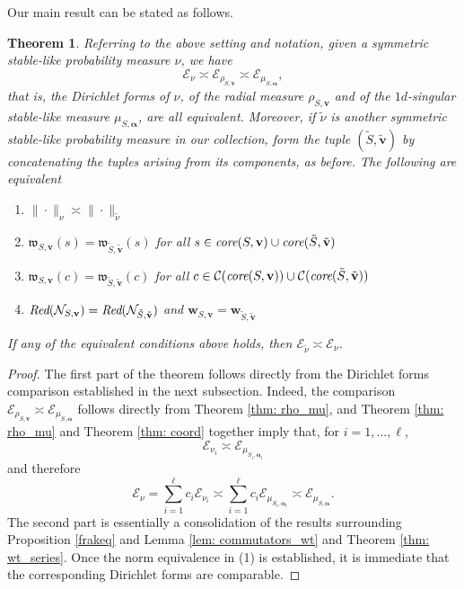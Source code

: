 \documentclass[pdflatex,sn-mathphys-num]{sn-jnl}%
\theoremstyle{thmstyleone}%
\newtheorem{theo}{Theorem}%
\theoremstyle{thmstyletwo}%
\theoremstyle{thmstylethree}%
\begin{document}
 Our main result can be stated as follows.
\begin{theo}
\label{thm: main1}
Referring to the above setting and notation, given a symmetric stable-like probability measure $\nu$, we have
$$\mathcal E_\nu\asymp \mathcal E_{\rho_{S,\mathbf{v}}}\asymp \mathcal E_{\mu_{S,\bm{\alpha}}},$$
that is, the Dirichlet forms of $\nu$, of the radial measure $\rho_{S,\mathbf{v}}$ and of the $1d$-singular stable-like measure $\mu_{S,\bm{\alpha}}$, are all equivalent.
Moreover, if $\tilde{\nu}$ is another symmetric stable-like probability measure in our collection, form the tuple
$(\tilde{S}, \tilde{\mathbf{v}})$ by concatenating the tuples arising from its components, as before.
The following are equivalent 
\begin{enumerate}
    \item $\|\cdot\|_{\nu}\asymp \|\cdot \|_{\tilde{\nu}}$
     \item $\mathfrak w_{S,\mathbf{v}}(s)=\mathfrak w_{\tilde{S},\tilde{\mathbf{v}}}(s)$ for all $
s \in \mbox{\em core}(S,\mathbf{v}) \cup \mbox{\em core}(\tilde{S},\tilde{\mathbf{v}})$ 
    \item $\mathfrak w_{S,\mathbf{v}}(c)=\mathfrak w_{\tilde{S},\tilde{\mathbf{v}}}(c)$ for all $
 c\in\mathcal{C}(\mbox{\em core}(S,\mathbf{v})) \cup \mathcal{C}(\mbox{\em core}(\tilde{S},\tilde{\mathbf{v}}))$ 
\item  $\mbox{\em Red}(\mathcal{N}_{S,\mathbf{v}}) = \mbox{\em Red}(\mathcal{N}_{\tilde{S},\tilde{\mathbf{v}}})$  and $\mathbf{w}_{S,\mathbf{v}} = \mathbf{w}_{\tilde{S},\tilde{\mathbf{v}}} $
\end{enumerate}
If any of the equivalent conditions above holds, then  $\mathcal E_{\tilde{\nu}}\asymp\mathcal E_\nu$. 
\end{theo}


\begin{proof}
    The first part of the theorem follows directly from the Dirichlet forms comparison established in the next subsection. Indeed, the comparison $\mathcal{E}_{\rho_{S,\mathbf{v}}} \asymp \mathcal{E}_{\mu_{S,\bm{\alpha}}}$ follows directly from Theorem \ref{thm: rho_mu}, and Theorem \ref{thm: rho_mu} and Theorem \ref{thm: coord} together imply that, for $i=1,\ldots, \ell$, $$\mathcal{E}_{\nu_i} \asymp \mathcal{E}_{\mu_{S_i ,\bm{\alpha}_i}}$$
    and therefore
    $$\mathcal{E}_{\nu} = \sum_{i=1}^\ell  c_i \mathcal{E}_{\nu_i} \asymp  \sum_{i=1}^\ell c_i \mathcal{E}_{\mu_{S_i ,\bm{\alpha}_i}} \asymp \mathcal{E}_{\mu_{S,\bm{\alpha}}}. $$ 
     The second part is essentially a consolidation of the results surrounding  Proposition \ref{frakeq} and Lemma \ref{lem: commutators_wt} and Theorem \ref{thm: wt_series}. Once the norm equivalence in (1) is established, it is immediate that the corresponding Dirichlet forms are comparable.   
\end{proof}
\end{document}
